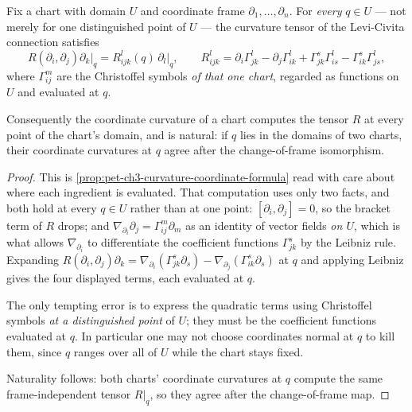 \begin{lemma}
  \label{lem:pet-ch6-offdiagonal-curvature-bridge}
  \leanok
  Fix a chart with domain $U$ and coordinate frame $\partial_1,\dots,\partial_n$.
  For \emph{every} $q\in U$ — not merely for one distinguished point of $U$ — the
  curvature tensor of the Levi-Civita connection satisfies
  \[
    R(\partial_i,\partial_j)\partial_k\big|_q=R^l_{ijk}(q)\,\partial_l\big|_q,
    \qquad
    R^l_{ijk}=\partial_i\Gamma^l_{jk}-\partial_j\Gamma^l_{ik}
      +\Gamma^s_{jk}\Gamma^l_{is}-\Gamma^s_{ik}\Gamma^l_{js},
  \]
  where $\Gamma^m_{ij}$ are the Christoffel symbols \emph{of that one chart},
  regarded as functions on $U$ and evaluated at $q$.

  Consequently the coordinate curvature of a chart computes the tensor $R$ at every
  point of the chart's domain, and is natural: if $q$ lies in the domains of two
  charts, their coordinate curvatures at $q$ agree after the change-of-frame
  isomorphism.
\end{lemma}
\begin{proof}
  \leanok
  This is \cref{prop:pet-ch3-curvature-coordinate-formula} read with care about
  where each ingredient is evaluated. That computation uses only two facts, and
  both hold at every $q\in U$ rather than at one point:
  $[\partial_i,\partial_j]=0$, so the bracket term of $R$ drops; and
  $\nabla_{\partial_i}\partial_j=\Gamma^m_{ij}\partial_m$ as an identity of vector
  fields \emph{on $U$}, which is what allows $\nabla_{\partial_i}$ to differentiate
  the coefficient functions $\Gamma^s_{jk}$ by the Leibniz rule. Expanding
  $R(\partial_i,\partial_j)\partial_k=\nabla_{\partial_i}(\Gamma^s_{jk}\partial_s)
  -\nabla_{\partial_j}(\Gamma^s_{ik}\partial_s)$ at $q$ and applying Leibniz gives
  the four displayed terms, each evaluated at $q$.

  The only tempting error is to express the quadratic terms using Christoffel
  symbols \emph{at a distinguished point} of $U$; they must be the coefficient
  functions evaluated at $q$. In particular one may not choose coordinates normal at
  $q$ to kill them, since $q$ ranges over all of $U$ while the chart stays fixed.

  Naturality follows: both charts' coordinate curvatures at $q$ compute the same
  frame-independent tensor $R|_q$, so they agree after the change-of-frame map.
\end{proof}

